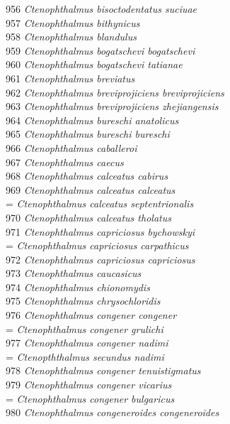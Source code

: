 \documentclass[
]{article}
\begin{document}
956 \emph{Ctenophthalmus bisoctodentatus suciuae}\\
957 \emph{Ctenophthalmus bithynicus}\\
958 \emph{Ctenophthalmus blandulus}\\
959 \emph{Ctenophthalmus bogatschevi bogatschevi}\\
960 \emph{Ctenophthalmus bogatschevi tatianae}\\
961 \emph{Ctenophthalmus breviatus}\\
962 \emph{Ctenophthalmus breviprojiciens breviprojiciens}\\
963 \emph{Ctenophthalmus breviprojiciens zhejiangensis}\\
964 \emph{Ctenophthalmus bureschi anatolicus}\\
965 \emph{Ctenophthalmus bureschi bureschi}\\
966 \emph{Ctenophthalmus caballeroi}\\
967 \emph{Ctenophthalmus caecus}\\
968 \emph{Ctenophthalmus calceatus cabirus}\\
969 \emph{Ctenophthalmus calceatus calceatus}\\
= \emph{Ctenophthalmus calceatus septentrionalis}\\
970 \emph{Ctenophthalmus calceatus tholatus}\\
971 \emph{Ctenophthalmus capriciosus bychowskyi}\\
= \emph{Ctenophthalmus capriciosus carpathicus}\\
972 \emph{Ctenophthalmus capriciosus capriciosus}\\
973 \emph{Ctenophthalmus caucasicus}\\
974 \emph{Ctenophthalmus chionomydis}\\
975 \emph{Ctenophthalmus chrysochloridis}\\
976 \emph{Ctenophthalmus congener congener}\\
= \emph{Ctenophthalmus congener grulichi}\\
977 \emph{Ctenophthalmus congener nadimi}\\
= \emph{Ctenopththalmus secundus nadimi}\\
978 \emph{Ctenophthalmus congener tenuistigmatus}\\
979 \emph{Ctenophthalmus congener vicarius}\\
= \emph{Ctenophthalmus congener bulgaricus}\\
980 \emph{Ctenophthalmus congeneroides congeneroides}\\
\end{document}
